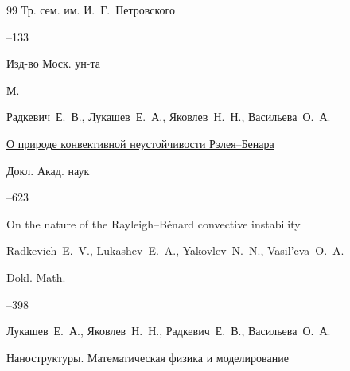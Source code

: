 \begin{thebibliography}{99}
\serial Тр. сем. им. И.~Г.~Петровского



--133

\publ Изд-во Моск. ун-та

\publaddr М.






\by Радкевич~Е.~В., Лукашев~Е.~А., Яковлев~Н.~Н., Васильева~О.~А.

\paper \href{https://elibrary.ru/item.asp?id=29766739}{О природе конвективной неустойчивости Рэлея--Бенара}

\jour Докл. Акад. наук




--623

\transl

\paper On the nature of the Rayleigh–Bénard convective instability 	

\by \linebreak Radkevich~E.~V., Lukashev~E.~A., Yakovlev~N.~N., Vasil'eva~O.~A.


\jour	Dokl. Math.



--398 








\by Лукашев~Е.~А., Яковлев~Н.~Н., Радкевич~Е.~В., Васильева~О.~А.

\jour Наноструктуры. Математическая физика и моделирование


\end{thebibliography}
